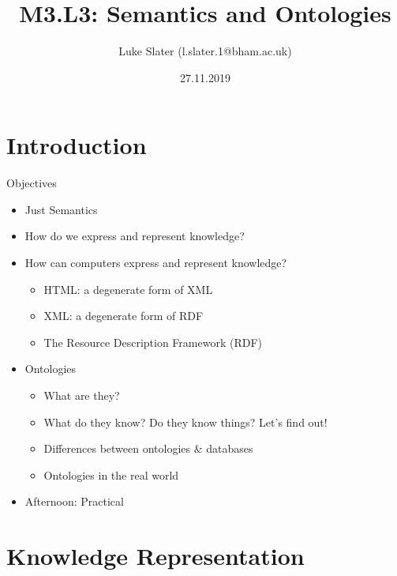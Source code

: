 \documentclass[aspectratio=169]{beamer} %
\title{M3.L3: Semantics and Ontologies}
\date{27.11.2019}
\author{Luke Slater (l.slater.1@bham.ac.uk)}
\institute{University of Birmingham - CCB - MSc Bioinformatics - Module 3}
\begin{document}
\small
\setlength{\abovedisplayskip}{4pt}
\setlength{\belowdisplayskip}{4pt}

\maketitle

\section{Introduction}

\begin{frame}{Objectives}
\begin{itemize}
  \item Just Semantics
  \item How do we express and represent knowledge?
  \item How can computers express and represent knowledge?
  \begin{itemize} 
    \item HTML: a degenerate form of XML
    \item XML: a degenerate form of RDF
    \item The Resource Description Framework (RDF)
  \end{itemize}
  \item Ontologies
  \begin{itemize} 
    \item What are they?
    \item What do they know? Do they know things? Let's find out!
    \item Differences between ontologies \& databases
    \item Ontologies in the real world
  \end{itemize}
  \item Afternoon: Practical
\end{itemize}
\end{frame}

\section{Knowledge Representation}
\end{document}
